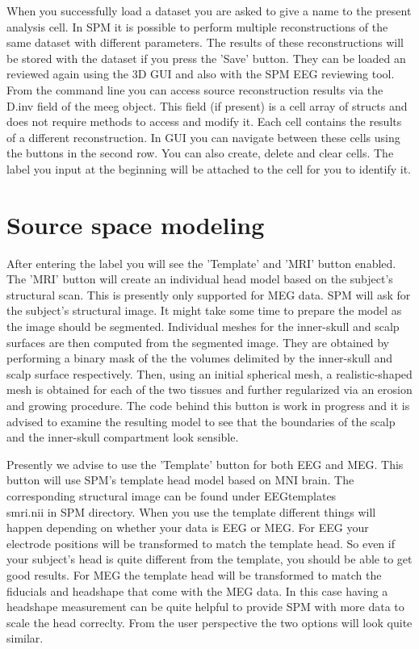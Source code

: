 When you successfully load a dataset you are asked to give a name to the present analysis cell. In SPM it is possible to
perform multiple reconstructions of the same dataset with different parameters. The results of these reconstructions
will be stored with the dataset if you press the 'Save' button. They can be loaded an reviewed again using
the 3D GUI and also with the SPM EEG reviewing tool. From the command line you can access source reconstruction
results via the D.inv field of the meeg object. This field (if present) is a cell array of structs and does not require
methods to access and modify it. Each cell contains the results of a different reconstruction. In GUI you
can navigate between these cells using the buttons in the second row. You can also create, delete and clear cells.
The label you input at the beginning will be attached to the cell for you to identify it.


\section{Source space modeling}

After entering the label you will see the 'Template' and 'MRI' button enabled. The 'MRI' button will 
create an individual head model based on the subject's structural scan. This is presently only supported for MEG
data. SPM will ask for the subject's structural image. It might take some time to prepare the model as the image
should be segmented. Individual meshes for the inner-skull and scalp surfaces are then computed from the
segmented image. They are obtained by performing a binary mask of the the volumes 
delimited by the inner-skull and scalp surface respectively. Then, using an initial 
spherical mesh, a realistic-shaped mesh is obtained for each of the two tissues 
and further regularized via an erosion and growing procedure. The code behind this button is work 
in progress and it is advised to examine the resulting
model to see that the boundaries of the scalp and the inner-skull compartment look sensible. 

Presently we advise to use the 'Template' button for both EEG and MEG. This button will use SPM's template head
model based on MNI brain. The corresponding structural image can be found under EEGtemplates\\smri.nii in SPM
directory. When you use the template different things will happen depending on whether your data is EEG or MEG.
For EEG your electrode positions will be transformed to match the template head. So even if your subject's head
is quite different from the template, you should be able to get good results. For MEG the template head will
be transformed to match the fiducials and headshape that come with the MEG data. In this case having a headshape
measurement can be quite helpful to provide SPM with more data to scale the head correclty. From the user
perspective the two options will look quite similar.

